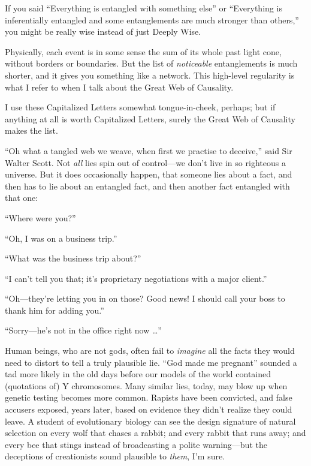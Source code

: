 {
 If you said ``Everything is entangled with
something else'' or ``Everything is
inferentially entangled and some entanglements are much stronger than
others,'' you might be really wise instead of just
Deeply Wise.}

{
 Physically, each event is in some sense the sum of its whole past
light cone, without borders or boundaries. But the list of
\textit{noticeable} entanglements is much shorter, and it gives you
something like a network. This high-level regularity is what I refer to
when I talk about the Great Web of Causality.}

{
 I use these Capitalized Letters somewhat tongue-in-cheek, perhaps;
but if anything at all is worth Capitalized Letters, surely the Great
Web of Causality makes the list.}

{
 ``Oh what a tangled web we weave, when first we
practise to deceive,'' said Sir Walter Scott. Not
\textit{all} lies spin out of control---we don't live
in so righteous a universe. But it does occasionally happen, that
someone lies about a fact, and then has to lie about an entangled fact,
and then another fact entangled with that one:}

{
 ``Where were you?''}

{
 ``Oh, I was on a business
trip.''}

{
 ``What was the business trip
about?''}

{
 ``I can't tell you that;
it's proprietary negotiations with a major
client.''}

{
 ``Oh---they're letting you in on
those? Good news! I should call your boss to thank him for adding
you.''}

{
 ``Sorry---he's not in the office
right now \ldots''}

{
 Human beings, who are not gods, often fail to \textit{imagine} all
the facts they would need to distort to tell a truly plausible lie.
``God made me pregnant'' sounded a
tad more likely in the old days before our models of the world
contained (quotations of) Y chromosomes. Many similar lies, today, may
blow up when genetic testing becomes more common. Rapists have been
convicted, and false accusers exposed, years later, based on evidence
they didn't realize they could leave. A student of
evolutionary biology can see the design signature of natural selection
on every wolf that chases a rabbit; and every rabbit that runs away;
and every bee that stings instead of broadcasting a polite
warning---but the deceptions of creationists sound plausible to
\textit{them}, I'm sure.}

